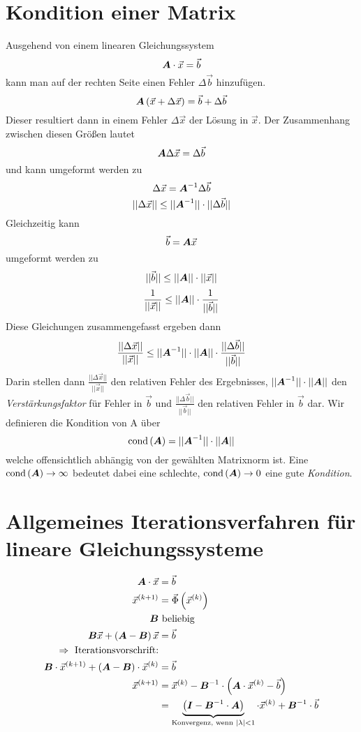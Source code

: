 \section{Kondition einer Matrix}
Ausgehend von einem linearen Gleichungssystem
\[\boldsymbol {A} \cdot \vec{x} = \vec{b}\]
kann man auf der rechten Seite einen Fehler $\Delta \vec{b}$ hinzufügen.
\[\boldsymbol {A} \left( \vec{x} + \Delta \vec{x} \right) = \vec{b} + \Delta \vec{b}\]
Dieser resultiert dann in einem Fehler $\Delta \vec{x}$ der Lösung in $\vec{x}$.
Der Zusammenhang zwischen diesen Größen lautet
\[\boldsymbol {A} \Delta \vec{x} = \Delta \vec{b}\]
und kann umgeformt werden zu
\[ \Delta \vec{x} = \boldsymbol {A}^{-1} \Delta \vec{b}\]
\[ ||\Delta \vec{x}|| \le ||\boldsymbol {A}^{-1}|| \cdot ||\Delta \vec{b}||\]
Gleichzeitig kann
\[\vec{b} = \boldsymbol {A} \vec{x}\]
umgeformt werden zu
\[||\vec{b}|| \le ||\boldsymbol {A}|| \cdot ||\vec{x}||\]
\[\frac{1}{||\vec{x}||} \le ||\boldsymbol {A}|| \cdot \frac{1}{||\vec{b}||}\]
Diese Gleichungen zusammengefasst ergeben dann
\[\frac{||\Delta \vec{x}||}{||\vec{x}||} \le ||\boldsymbol {A}^{-1}|| \cdot ||\boldsymbol {A}|| \cdot \frac{||\Delta \vec{b}||}{||\vec{b}||}\]
Darin stellen dann $\frac{||\Delta \vec{x}||}{||\vec{x}||}$ den relativen Fehler des Ergebnisses, $||\boldsymbol {A}^{-1}|| \cdot ||\boldsymbol {A}||$ den \emph{Verstärkungsfaktor} für Fehler in $\vec{b}$ und $\frac{||\Delta \vec{b}||}{||\vec{b}||}$ den relativen Fehler in $\vec{b}$ dar. Wir definieren die Kondition von A über
\[\text{cond}\left(\boldsymbol {A}\right) = ||\boldsymbol {A}^{-1}|| \cdot ||\boldsymbol {A}||\]
welche offensichtlich abhängig von der gewählten Matrixnorm ist. Eine $\text{cond}\left(\boldsymbol {A}\right) \rightarrow \infty$ bedeutet dabei eine schlechte, $\text{cond}\left(\boldsymbol {A}\right) \rightarrow 0$ eine gute \emph{Kondition}.

\section{Allgemeines Iterationsverfahren für lineare Gleichungssysteme}
\begin{align}
	\boldsymbol {A} \cdot \vec{x} &= \vec{b}\\
	\vec{x}^{(k+1)} &= \vec{\Phi} \left( \vec{x}^{(k)}\right)\\
	\boldsymbol {B} &\text{ beliebig}\\
	\boldsymbol {B} \vec{x} + \left( \boldsymbol {A} - \boldsymbol {B} \right) \vec{x} &= \vec{b} \quad \\
	\Rightarrow \text{ Iterationsvorschrift:}&\\
	\boldsymbol {B} \cdot \vec{x}^{(k+1)} + \left(  \boldsymbol {A} - \boldsymbol {B} \right) \cdot \vec{x}^{(k)} &= \vec{b}\\
	\vec{x}^{(k+1)} &= \vec{x}^{(k)} - \boldsymbol {B}^{-1} \cdot \left( \boldsymbol {A} \cdot \vec{x}^{(k)} - \vec{b} \right) \\
	&= \underbrace{\left( \boldsymbol {I} - \boldsymbol {B}^{-1} \cdot \boldsymbol {A}\right)}_{\text{Konvergenz, wenn }|\lambda| < 1} \cdot \vec{x}^{(k)} + \boldsymbol {B}^{-1} \cdot \vec{b}
\end{align}

